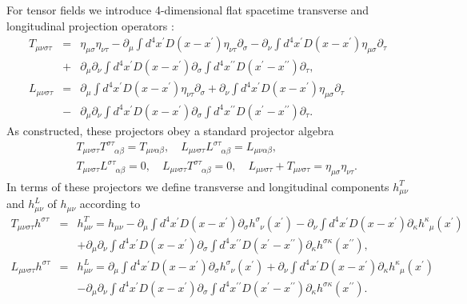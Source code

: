\documentclass[aps,onecolumn,10pt]{revtex4}
\numberwithin{equation}{section}
\numberwithin{equation}{section}
\begin{document}
For tensor fields we introduce 4-dimensional flat  spacetime transverse and longitudinal projection operators \cite{Mannheim2005,Amarasinghe2018}: 
%
\begin{eqnarray}
T_{\mu\nu\sigma\tau}&=&\eta_{\mu\sigma}\eta_{\nu\tau}
-\partial_{\mu}\int d^4x^{\prime}D(x-x^{\prime})
\eta_{\nu\tau}\partial_{\sigma}
-\partial_{\nu}\int d^4x^{\prime}D(x-x^{\prime})
\eta_{\mu\sigma}\partial_{\tau}
\nonumber \\
&+&\partial_{\mu}\partial_{\nu}\int
d^4x^{\prime}D(x-x^{\prime})\partial_{\sigma}\int
d^4x^{\prime\prime}D(x^{\prime}-x^{\prime\prime})
\partial_{\tau},
\nonumber\\
L_{\mu\nu\sigma\tau}&=&\partial_{\mu}\int d^4x^{\prime}D(x-x^{\prime})
\eta_{\nu\tau}\partial_{\sigma}
+\partial_{\nu}\int d^4x^{\prime}D(x-x^{\prime})
\eta_{\mu\sigma}\partial_{\tau}
\nonumber \\
&-&\partial_{\mu}\partial_{\nu}\int
d^4x^{\prime}D(x-x^{\prime})\partial_{\sigma}\int
d^4x^{\prime\prime}D(x^{\prime}-x^{\prime\prime})
\partial_{\tau}.
\label{A.9a}
\end{eqnarray}
%
As constructed, these projectors obey a standard projector algebra
%
\begin{eqnarray}
&&T_{\mu\nu\sigma\tau}T^{\sigma\tau}_{\phantom{\sigma\tau}\alpha\beta}=
T_{\mu\nu\alpha\beta},\quad
L_{\mu\nu\sigma\tau}L^{\sigma\tau}_{\phantom{\sigma\tau}\alpha\beta}
=L_{\mu\nu\alpha\beta},
\nonumber \\
&&T_{\mu\nu\sigma\tau}L^{\sigma\tau}_{\phantom{\sigma\tau}\alpha\beta}=
0,\quad
L_{\mu\nu\sigma\tau}T^{\sigma\tau}_{\phantom{\sigma\tau}\alpha\beta}
=0,\quad L_{\mu\nu\sigma\tau}
+T_{\mu\nu\sigma\tau}
=\eta_{\mu\sigma}\eta_{\nu\tau}.
\label{A.10a}
\end{eqnarray}
% 
In terms of these projectors we define transverse and longitudinal components $h^{T}_{\mu\nu}$ and $h^{L}_{\mu\nu}$ of $h_{\mu\nu}$ according to
% 
\begin{eqnarray}
T_{\mu\nu\sigma\tau}h^{\sigma\tau}&=&h^{T}_{\mu\nu}=h_{\mu\nu}
-\partial_{\mu}\int
d^4x^{\prime}D(x-x^{\prime})\partial_{\sigma}
h^{\sigma}_{\phantom{\sigma}\nu}(x^{\prime}) 
-\partial_{\nu}\int d^4x^{\prime}D(x-x^{\prime})
\partial_{\kappa}h^{\kappa}_{\phantom{\kappa}\mu}(x^{\prime})
\nonumber \\
&&+\partial_{\mu}\partial_{\nu}\int
d^4x^{\prime}D(x-x^{\prime})\partial_{\sigma}\int
d^4x^{\prime\prime}D(x^{\prime}-x^{\prime\prime})
\partial_{\kappa}h^{\sigma\kappa}(x^{\prime\prime}),
\nonumber\\
L_{\mu\nu\sigma\tau}h^{\sigma\tau}&=&h^{L}_{\mu\nu}=\partial_{\mu}\int
d^4x^{\prime}D(x-x^{\prime})\partial_{\sigma}
h^{\sigma}_{\phantom{\sigma}\nu}(x^{\prime}) 
+\partial_{\nu}\int d^4x^{\prime}D(x-x^{\prime})
\partial_{\kappa}h^{\kappa}_{\phantom{\kappa}\mu}(x^{\prime})
\nonumber \\
&&-\partial_{\mu}\partial_{\nu}\int
d^4x^{\prime}D(x-x^{\prime})\partial_{\sigma}\int
d^4x^{\prime\prime}D(x^{\prime}-x^{\prime\prime})
\partial_{\kappa}h^{\sigma\kappa}(x^{\prime\prime}).
\label{A.11a}
\end{eqnarray}
\end{document}
